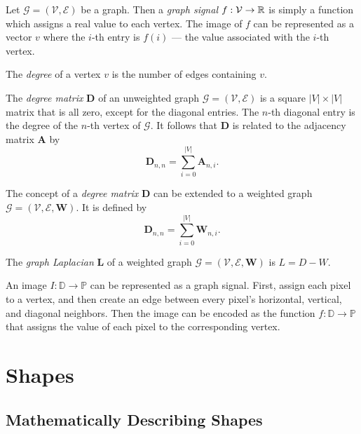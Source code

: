\begin{defn}
    Let $\mathcal{G} = (\mathcal{V}, \mathcal{E})$ be a graph. Then a \emph{graph signal} $f: \mathcal{V} \to \mathbb{R}$ is simply a function which assigns a real value to each vertex. The image of $f$ can be represented as a vector $v$ where the $i$-th entry is $f(i)$ --- the value associated with the $i$-th vertex.
\end{defn}

\begin{defn}
    The \emph{degree} of a vertex $v$ is the number of edges containing $v$.
\end{defn}

\begin{defn}
    The \emph{degree matrix} $\bm{D}$ of an unweighted graph $\mathcal{G} = (\mathcal{V}, \mathcal{E})$ is a square $|V| \times |V|$ matrix that is all zero, except for the diagonal entries. The $n$-th diagonal entry is the degree of the $n$-th vertex of $\mathcal{G}$. It follows that $\bm{D}$ is related to the adjacency matrix $\bm{A}$ by \[\bm{D}_{n,n} = \sum_{i=0}^{|V|}\bm{A}_{n,i}.\]
\end{defn}

\begin{defn}
    The concept of a \emph{degree matrix} $\bm{D}$ can be extended to a weighted graph $\mathcal{G} = (\mathcal{V}, \mathcal{E}, \bm{W})$. It is defined by \[\bm{D}_{n,n} = \sum_{i=0}^{|V|}\bm{W}_{n,i}.\]
\end{defn}

\begin{defn}
    The \emph{graph Laplacian} $\bm{L}$ of a weighted graph $\mathcal{G} = (\mathcal{V}, \mathcal{E}, \bm{W})$ is $L = D - W$.
\end{defn}

An image $I: \mathbb{D} \to \mathbb{P}$ can be represented as a graph signal. First, assign each pixel to a vertex, and then create an edge between every pixel's horizontal, vertical, and diagonal neighbors. Then the image can be encoded as the function $f: \mathbb{D} \to \mathbb{P}$ that assigns the value of each pixel to the corresponding vertex.

\section{Shapes}

\subsection{Mathematically Describing Shapes}

